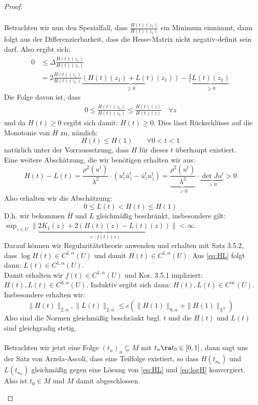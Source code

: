 \begin{proof}
\begin{itemize}
\begin{align*}
      \end{align*}
      Betrachten wir nun den Spezialfall, dass $\frac{\dot H(t)(z_1)}{H(t)(z_1)}$ ein Minimum einnimmt, dann folgt aus der Differenzierbarkeit, dass die Hesse-Matrix nicht negativ-definit sein darf. Also ergibt sich:
      \begin{align*}
	0 & \leq \Delta \frac{\dot H(t)(z_1)}{H(t)(z_1)} \\
	& =  2 \frac{\dot H(t)(z_1)}{H(t)(z_1)} \underbrace{(H(t)(z_1) + L(t)(z_1))}_{ \geq 0} - \frac4t \underbrace{L(t)(z_1)}_{\geq 0}
      \end{align*}
      Die Folge davon ist, dass
      \begin{align*}
	0 \leq \frac{\dot H(t)(z_1)}{H(t)(z_1)} \leq \frac{\dot H(t)(z)}{H(t)(z)} \quad \forall z
      \end{align*}
      und da $H(t) \geq 0$ ergibt sich damit: $\dot H(t) \geq 0$. Dies lässt Rückschlüsse auf die Monotonie von $H$ zu, nämlich:
      \[
      H(t) \leq H(1) \qquad \forall 0 < t < 1
      \]
      natürlich unter der Vorraussetzung, dass $H$ für dieses $t$ überhaupt existiert. \\
      Eine weitere Abschätzung, die wir benötigen erhalten wir aus:
      \[
      H(t) - L(t) = \frac{\rho^2(u^t)}{\lambda^2} \cdot ( u^t_z \bar u^t_{\bar z} - \bar u^t_z u^t_{\bar z} ) = \underbrace{\frac{\rho^2(u^t)}{\lambda^2}}_{> 0} \cdot \underbrace{ \det Ju^t }_{> 0} > 0
      \]
      Also erhalten wir die Abschätzung:
      \[
      0 \leq L(t) < H(t) \leq H(1)
      \]
      D.h. wir bekommen $H$ und $L$ gleichmäßig beschränkt, insbesondere gilt: \\
      $\sup_{z \in U} \| \underbrace{2K_1(z) + 2(H(t)(z) - L(t)(z))}_{=:f(t)(z)} \| < \infty$. \\
      Darauf können wir Regularitätstheorie anwenden und erhalten mit Satz 3.5.2, dass $\log H(t) \in C^{1,\alpha}(U)$ und damit $H(t) \in C^{1,\alpha}(U)$. Aus \eqref{eq:HL} folgt dann: $L(t) \in C^{1, \alpha}(U)$. \\
      Damit erhalten wir $f(t) \in C^{1,\alpha}(U)$ und Kor. 3.5.1 impliziert: $H(t),L(t) \in C^{3,\alpha}(U)$. Induktiv ergibt sich dann: $H(t), L(t) \in C^\infty(U)$. Insbesondere erhalten wir:
      \[
      \|H(t)\|_{2, \alpha}, \|L(t)\|_{2, \alpha} \leq c ( \|H(1)\|_{0, \alpha} + \|H(1)\|_{L^2})
      \]
      Also sind die Normen gleichmäßig beschränkt bzgl. $t$ und die $H(t)$ und $L(t)$ sind gleichgradig stetig. \\
      \\
      Betrachten wir jetzt eine Folge $(t_n)_n \subseteq M$ mit $t_n \ra t_0 \in [0,1]$, dann sagt uns der Satz von Arzela-Ascoli, dass eine Teilfolge existiert, so dass $H(t_{n_k})$ und $L(t_{n_k})$ gleichmäßig gegen eine Lösung von \eqref{eq:HL} und \eqref{eq:logH} konvergiert. Also ist $t_0 \in M$ und $M$ damit abgeschlossen.


\end{itemize}
\end{proof}
